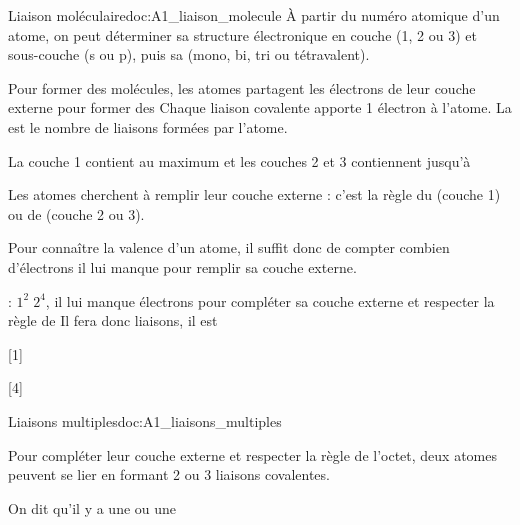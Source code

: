 \begin{doc}{Liaison moléculaire}{doc:A1_liaison_molecule}
  À partir du numéro atomique d'un atome, on peut déterminer sa structure électronique en couche (1, 2 ou 3) et sous-couche (s ou p), puis sa  (mono, bi, tri ou tétravalent).
  \begin{importants}
    Pour former des molécules, les atomes partagent les électrons de leur couche externe pour former des 
    Chaque liaison covalente apporte 1 électron à l'atome.
    La  est le nombre de liaisons formées par l'atome.
  \end{importants}
  \begin{importants}
    La couche 1 contient au maximum  et les couches 2 et 3 contiennent jusqu'à 

    Les atomes cherchent à remplir leur couche externe : c'est la règle du  (couche 1) ou de  (couche 2 ou 3).
  \end{importants}
  Pour connaître la valence d'un atome, il suffit donc de compter combien d'électrons il lui manque pour remplir sa couche externe.

  \exemple {} : $1^2\; 2^4$,
  il lui manque  électrons pour compléter sa couche externe et respecter la règle de 
  Il fera donc  liaisons, il est 
\end{doc}


[1]

%
\newpage
\vspace*{-30pt}
[4]


\begin{doc}{Liaisons multiples}{doc:A1_liaisons_multiples}
  \begin{importants}
    Pour compléter leur couche externe et respecter la règle de l'octet, deux atomes peuvent se lier en formant 2 ou 3 liaisons covalentes.
    
    On dit qu'il y a une  ou une 
  \end{importants}
\end{doc}

